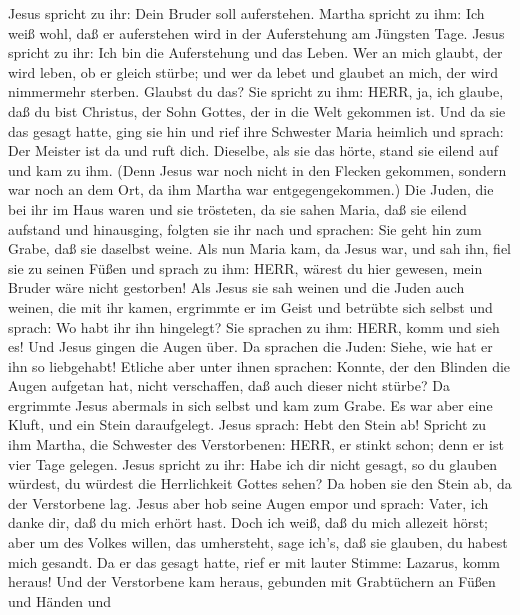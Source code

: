 Jesus spricht zu ihr: Dein Bruder soll auferstehen.  Martha
spricht zu ihm: Ich weiß wohl, daß er auferstehen wird in der
Auferstehung am Jüngsten Tage.  Jesus spricht zu ihr: Ich
bin die Auferstehung und das Leben. Wer an mich glaubt, der wird leben,
ob er gleich stürbe;  und wer da lebet und glaubet an mich,
der wird nimmermehr sterben. Glaubst du das?  Sie spricht
zu ihm: HERR, ja, ich glaube, daß du bist Christus, der Sohn Gottes, der
in die Welt gekommen ist.  Und da sie das gesagt hatte,
ging sie hin und rief ihre Schwester Maria heimlich und sprach: Der
Meister ist da und ruft dich.  Dieselbe, als sie das hörte,
stand sie eilend auf und kam zu ihm.  (Denn Jesus war noch
nicht in den Flecken gekommen, sondern war noch an dem Ort, da ihm
Martha war entgegengekommen.)  Die Juden, die bei ihr im
Haus waren und sie trösteten, da sie sahen Maria, daß sie eilend
aufstand und hinausging, folgten sie ihr nach und sprachen: Sie geht hin
zum Grabe, daß sie daselbst weine.  Als nun Maria kam, da
Jesus war, und sah ihn, fiel sie zu seinen Füßen und sprach zu ihm:
HERR, wärest du hier gewesen, mein Bruder wäre nicht gestorben!
 Als Jesus sie sah weinen und die Juden auch weinen, die
mit ihr kamen, ergrimmte er im Geist und betrübte sich selbst
 und sprach: Wo habt ihr ihn hingelegt? Sie sprachen zu
ihm: HERR, komm und sieh es!  Und Jesus gingen die Augen
über.  Da sprachen die Juden: Siehe, wie hat er ihn so
liebgehabt!  Etliche aber unter ihnen sprachen: Konnte, der
den Blinden die Augen aufgetan hat, nicht verschaffen, daß auch dieser
nicht stürbe?  Da ergrimmte Jesus abermals in sich selbst
und kam zum Grabe. Es war aber eine Kluft, und ein Stein daraufgelegt.
 Jesus sprach: Hebt den Stein ab! Spricht zu ihm Martha,
die Schwester des Verstorbenen: HERR, er stinkt schon; denn er ist vier
Tage gelegen.  Jesus spricht zu ihr: Habe ich dir nicht
gesagt, so du glauben würdest, du würdest die Herrlichkeit Gottes sehen?
 Da hoben sie den Stein ab, da der Verstorbene lag. Jesus
aber hob seine Augen empor und sprach: Vater, ich danke dir, daß du mich
erhört hast.  Doch ich weiß, daß du mich allezeit hörst;
aber um des Volkes willen, das umhersteht, sage ich's, daß sie glauben,
du habest mich gesandt.  Da er das gesagt hatte, rief er
mit lauter Stimme: Lazarus, komm heraus!  Und der
Verstorbene kam heraus, gebunden mit Grabtüchern an Füßen und Händen und
